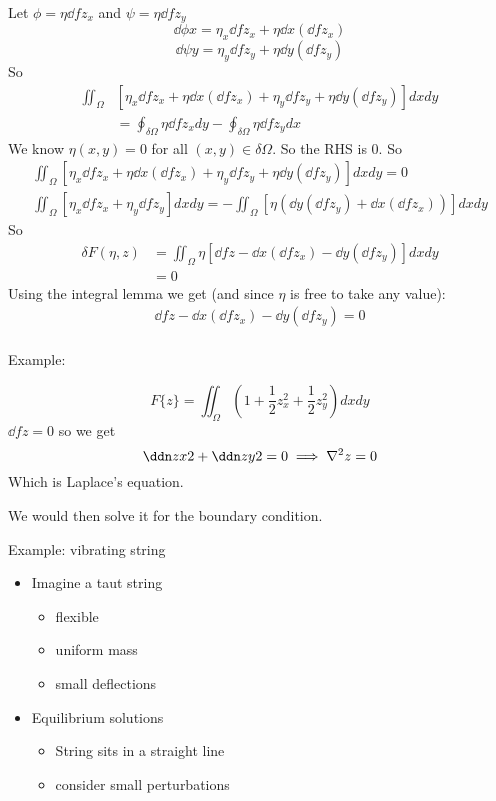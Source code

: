 \documentclass{X:/Documents/Coding/Latex/myassignment}
\begin{document}
Let $\phi = \eta \dd f{z_x}$ and $\psi = \eta \dd f{z_y}$
\[\dd \phi x = \eta_x \dd f{z_x} + \eta \dd{}x \left(\dd f{z_x}\right)\]
\[\dd \psi y = \eta_y \dd f{z_y} + \eta \dd{}y \left(\dd f{z_y}\right)\]
So
\begin{align*}
	\iint_{\Omega} &\left[\eta_x \dd f{z_x} + \eta \dd{}x\left(\dd f{z_x}\right) + \eta_y \dd f{z_y} + \eta \dd{}y \left(\dd f{z_y}\right)\right] dxdy\\
	&= \oint_{\delta \Omega} \eta \dd f{z_x} dy - \oint_{\delta\Omega} \eta \dd f{z_y} dx
\end{align*}
We know $\eta(x,y) = 0$ for all $(x,y) \in \delta \Omega$. So the RHS is $0$. So
\begin{align*}
	\iint_{\Omega} \left[\eta_x \dd f{z_x} + \eta \dd{}x\left(\dd f{z_x}\right) + \eta_y \dd f{z_y} + \eta \dd{}y \left(\dd f{z_y}\right)\right] dxdy =0\\
	\iint_{\Omega} \left[\eta_x \dd f{z_x} + \eta_y \dd f{z_y} \right] dxdy = -\iint_{\Omega} \left[ \eta \left(\dd{}y \left(\dd f{z_y}\right) + \dd{}x\left(\dd f{z_x}\right) \right)\right] dxdy
\end{align*}
So
\begin{align*}
	\delta F(\eta,z) &= \iint_{\Omega} \eta \left[\dd fz - \dd{}x \left(\dd f{z_x}\right) - \dd{}y \left(\dd f{z_y}\right)\right] dx dy\\
	&= 0 
\end{align*}
Using the integral lemma we get (and since $\eta$ is free to take any value):
\begin{align*}
	 \dd fz - \dd{}x \left(\dd f{z_x}\right) - \dd{}y \left(\dd f{z_y}\right)  =0\\
\end{align*}

Example:

\[F\{z\} = \iint_{\Omega} \left(1 + \frac12 z_x^2 + \frac12 z_y^2\right) dxdy\]
$\dd fz = 0 $ so we get
\[\ddn zx2 + \ddn zy2 = 0 \implies \nabla^2 z = 0\]
Which is Laplace's equation.

We would then solve it for the boundary condition.

Example: vibrating string

\begin{itemize}
	\item Imagine a taut string
	\begin{itemize}
		\item flexible
		\item uniform mass
		\item small deflections
	\end{itemize}
	\item Equilibrium solutions
	\begin{itemize}
		\item String sits in a straight line
		\item consider small perturbations
	\end{itemize}
\end{itemize}
\end{document}
